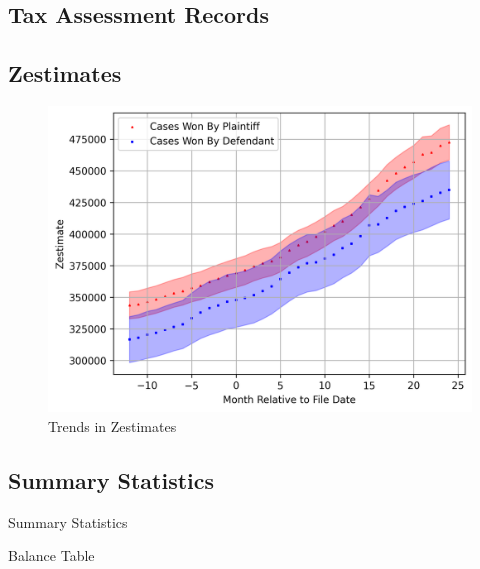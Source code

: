\documentclass[12pt]{article}
\begin{document}
    \subsection{Tax Assessment Records}
    \subsection{Zestimates}
        \begin{figure}[H]
            \centering
            \includegraphics{output/summary_statistics/figures/trends_in_zestimates.png}
            \caption{Trends in Zestimates}
            \label{fig:my_label}
        \end{figure}
    \begin{landscape}
    \subsection{Summary Statistics}
         \begin{table}[H]
            \centering
            \small
            
            \caption{Summary Statistics}
            \label{tab:table_1}
        \end{table}
        \newpage
        \begin{table}[H]
            \centering
            \small
            
            \caption{Balance Table}
            \label{tab:my_label}
        \end{table}
    \end{landscape}
    
\end{document}
